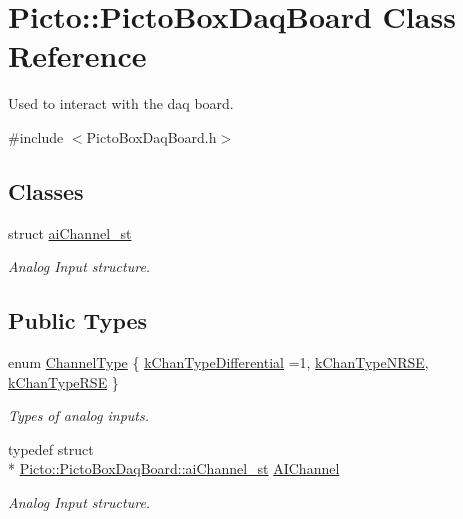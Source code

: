 \hypertarget{class_picto_1_1_picto_box_daq_board}{\section{Picto\-:\-:Picto\-Box\-Daq\-Board Class Reference}
\label{class_picto_1_1_picto_box_daq_board}
}


Used to interact with the daq board.  




{\ttfamily \#include $<$Picto\-Box\-Daq\-Board.\-h$>$}

\subsection*{Classes}
\begin{DoxyCompactItemize}
\item 
struct \hyperlink{struct_picto_1_1_picto_box_daq_board_1_1ai_channel__st}{ai\-Channel\-\_\-st}
\begin{DoxyCompactList}\small\item\em Analog Input structure. \end{DoxyCompactList}\end{DoxyCompactItemize}
\subsection*{Public Types}
\begin{DoxyCompactItemize}
\item 
enum \hyperlink{class_picto_1_1_picto_box_daq_board_a360f27f60651ecf404df481d9e214839}{Channel\-Type} \{ \hyperlink{class_picto_1_1_picto_box_daq_board_a360f27f60651ecf404df481d9e214839a36bee24a6a3a71c93155309dd0d6554a}{k\-Chan\-Type\-Differential} =1, 
\hyperlink{class_picto_1_1_picto_box_daq_board_a360f27f60651ecf404df481d9e214839a858508579312a982f510f5ecfa27cbe5}{k\-Chan\-Type\-N\-R\-S\-E}, 
\hyperlink{class_picto_1_1_picto_box_daq_board_a360f27f60651ecf404df481d9e214839a8e74d3a80bf4488ecf15c4e1cd90a4b6}{k\-Chan\-Type\-R\-S\-E}
 \}
\begin{DoxyCompactList}\small\item\em Types of analog inputs. \end{DoxyCompactList}\item 
\hypertarget{class_picto_1_1_picto_box_daq_board_ab68067ef89b37aa5f57c9c0c433a941f}{typedef struct \\*
\hyperlink{struct_picto_1_1_picto_box_daq_board_1_1ai_channel__st}{Picto\-::\-Picto\-Box\-Daq\-Board\-::ai\-Channel\-\_\-st} \hyperlink{class_picto_1_1_picto_box_daq_board_ab68067ef89b37aa5f57c9c0c433a941f}{A\-I\-Channel}}\label{class_picto_1_1_picto_box_daq_board_ab68067ef89b37aa5f57c9c0c433a941f}

\begin{DoxyCompactList}\small\item\em Analog Input structure. \end{DoxyCompactList}\end{DoxyCompactItemize}
